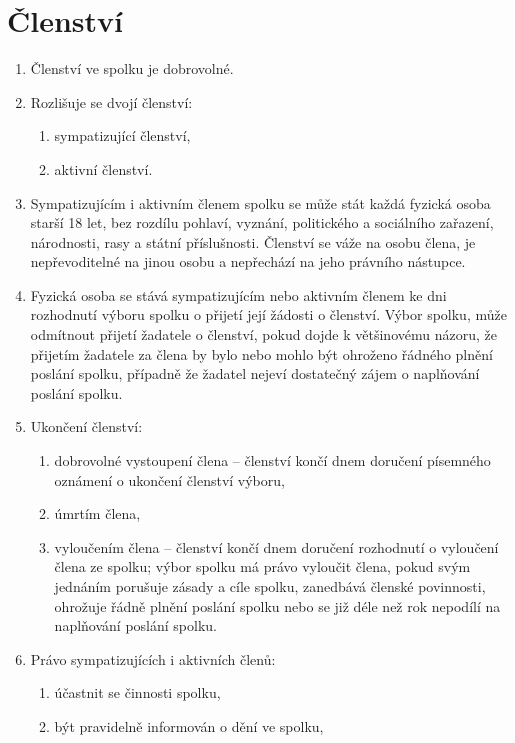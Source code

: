 \documentclass[11pt]{article}
\begin{document}
\section{Členství}
\begin{enumerate}
    \item Členství ve spolku je dobrovolné.
    \item Rozlišuje se dvojí členství:
    \begin{enumerate}
        \item sympatizující členství,
        \item aktivní členství.
    \end{enumerate}
    \item Sympatizujícím i aktivním členem spolku se může stát každá fyzická 
    osoba starší 18 let, bez rozdílu pohlaví, vyznání, politického a sociálního 
    zařazení, národnosti, rasy a státní příslušnosti. Členství se váže na osobu 
    člena, je nepřevoditelné na jinou osobu a nepřechází na jeho 
    právního nástupce. 
    \item Fyzická osoba se stává sympatizujícím nebo aktivním členem ke dni 
    rozhodnutí výboru spolku o přijetí její žádosti o členství. Výbor spolku, 
    může odmítnout přijetí žadatele o členství, pokud dojde k většinovému 
    názoru, že přijetím žadatele za člena by bylo nebo mohlo být ohroženo 
    řádného plnění poslání spolku, případně že žadatel nejeví dostatečný zájem 
    o naplňování poslání spolku.
    \item Ukončení členství:
    \begin{enumerate}
        \item dobrovolné vystoupení člena – členství končí dnem doručení 
        písemného oznámení o ukončení členství výboru,
        \item úmrtím člena,
        \item vyloučením člena – členství končí dnem doručení rozhodnutí 
        o vyloučení člena ze spolku; výbor spolku má právo vyloučit člena, 
        pokud svým jednáním porušuje zásady a cíle spolku, zanedbává členské 
        povinnosti, ohrožuje řádně plnění poslání spolku nebo se již déle než 
        rok nepodílí na naplňování poslání spolku.
    \end{enumerate}
    \item Právo sympatizujících i aktivních členů:
    \begin{enumerate}
        \item účastnit se činnosti spolku,
        \item být pravidelně informován o dění ve spolku,

\end{enumerate}
\end{enumerate}
\end{document}
